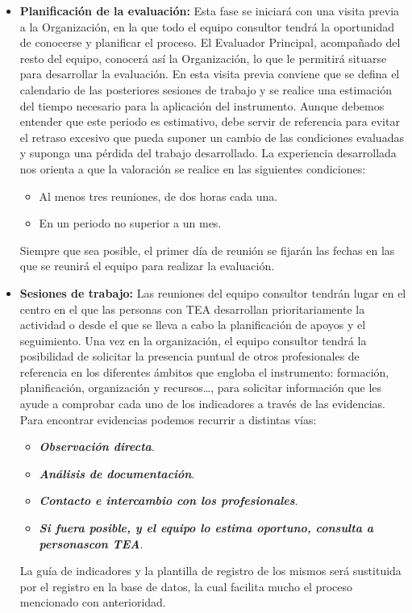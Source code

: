 \begin{itemize}
	\item \textbf{Planificación de la evaluación: }
	Esta fase se iniciará con una visita previa a la Organización, en la que todo el
	equipo consultor tendrá la oportunidad de conocerse y planificar el proceso. El
	Evaluador Principal, acompañado del resto del equipo, conocerá así la
	Organización, lo que le permitirá situarse para desarrollar la evaluación.
	En esta visita previa conviene que se defina el calendario de las posteriores
	sesiones de trabajo y se realice una estimación del tiempo necesario para la
	aplicación del instrumento. Aunque debemos entender que este periodo es
	estimativo, debe servir de referencia para evitar el retraso excesivo que pueda
	suponer un cambio de las condiciones evaluadas y suponga una pérdida del
	trabajo desarrollado.
	La experiencia desarrollada nos orienta a que la valoración se realice en las
	siguientes condiciones:
	\begin{itemize}
		\item Al menos tres reuniones, de dos horas cada una.
		\item En un periodo no superior a un mes.
	\end{itemize}
	
	Siempre que sea posible, el primer día de reunión se fijarán las fechas en las
	que se reunirá el equipo para realizar la evaluación.
	\item \textbf{Sesiones de trabajo: }Las reuniones del equipo consultor tendrán lugar en el centro en el que las
	personas con TEA desarrollan prioritariamente la actividad o desde el que se
	lleva a cabo la planificación de apoyos y el seguimiento.
	Una vez en la organización, el equipo consultor tendrá la posibilidad de solicitar
	la presencia puntual de otros profesionales de referencia en los diferentes
	ámbitos que engloba el instrumento: formación, planificación, organización y
	recursos…, para solicitar información que les ayude a comprobar cada uno de
	los indicadores a través de las evidencias.
	Para encontrar evidencias podemos recurrir a distintas vías:
	\begin{itemize}
		\item \textbf{\textit{Observación directa}}.
		\item \textbf{\textit{Análisis de documentación}}.
		\item \textbf{\textit{Contacto e intercambio con los profesionales}}.
		\item \textbf{\textit{Si fuera posible, y el equipo lo estima oportuno, consulta a personascon TEA}}.
	\end{itemize}
	La guía de indicadores y la plantilla de registro de los mismos será
	sustituida por el registro en la base de datos, la cual facilita mucho el
	proceso mencionado con anterioridad.


\end{itemize}
